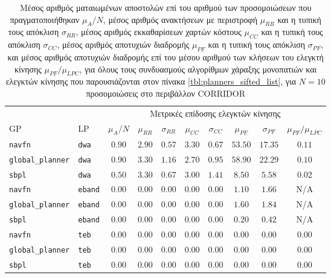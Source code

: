 \begin{table}[h]
\renewcommand{\arraystretch}{1.3}
\begin{tabular}{llcccccccc}
  & & \multicolumn{8}{c}{Μετρικές επίδοσης ελεγκτών κίνησης} \\
  \cline{3-10}
    GP & LP & $\mu_{A} / N$ & $\mu_{RR}$ & $\sigma_{RR}$ & $\mu_{CC}$ & $\sigma_{CC}$ & $\mu_{PF}$ & $\sigma_{PF}$ & $\mu_{PF} / \mu_{LPC}$ \\ \toprule
    \texttt{navfn} & \texttt{dwa} & $0.90$ & $2.90$ & $0.57$ & $3.30$ & $0.67$ & $53.50$ & $17.35$ & $0.11$ \\
    \texttt{global\_planner} & \texttt{dwa} & $0.90$ & $3.30$ & $1.16$ & $2.70$ & $0.95$ & $58.90$ & $22.29$ & $0.10$ \\
    \texttt{sbpl} & \texttt{dwa} & $0.50$ & $3.30$ & $0.67$ & $3.00$ & $1.41$ & $8.50$ & $5.58$ & $0.02$ \\
    \texttt{navfn} & \texttt{eband} & $0.00$ & $0.00$ & $0.00$ & $0.00$ & $0.00$ & $1.10$ & $1.66$ & N/A \\
    \texttt{global\_planner} & \texttt{eband} & $0.00$ & $0.00$ & $0.00$ & $0.00$ & $0.00$ & $1.60$ & $1.84$ & N/A \\
    \texttt{sbpl} & \texttt{eband} & $0.00$ & $0.00$ & $0.00$ & $0.00$ & $0.00$ & $0.20$ & $0.42$ & N/A \\
    \texttt{navfn} & \texttt{teb} & $0.00$ & $0.00$ & $0.00$ & $0.00$ & $0.00$ & $0.00$ & $0.00$ & $0.00$ \\
    \texttt{global\_planner} & \texttt{teb} & $0.00$ & $0.00$ & $0.00$ & $0.00$ & $0.00$ & $0.00$ & $0.00$ & $0.00$ \\
    \texttt{sbpl} & \texttt{teb} & $0.00$ & $0.00$ & $0.00$ & $0.00$ & $0.00$ & $0.00$ & $0.00$ & $0.00$ \\ \bottomrule
\end{tabular}
\caption{\small Μέσος αριθμός ματαιωμένων αποστολών επί του αριθμού των
      προσομοιώσεων που πραγματοποιήθηκαν $\mu_A / N$, μέσος αριθμός ανακτήσεων
      με περιστροφή $\mu_{RR}$ και η τυπική τους απόκλιση $\sigma_{RR}$, μέσος
      αριθμός εκκαθαρίσεων χαρτών κόστους $\mu_{CC}$ και η τυπική τους απόκλιση
      $\sigma_{CC}$, μέσος αριθμός αποτυχιών διαδρομής $\mu_{PF}$ και η τυπική
      τους απόκλιση $\sigma_{PF}$, και μέσος αριθμός αποτυχιών διαδρομής επί
      του μέσου αριθμού των κλήσεων του ελεγκτή κίνησης $\mu_{PF} / \mu_{LPC}$,
      για όλους τους συνδυασμούς αλγορίθμων χάραξης μονοπατιών και ελεγκτών
      κίνησης που παρουσιάζονται στον πίνακα \ref{tbl:planners_sifted_list},
      για $N=10$ προσομοιώσεις στο περιβάλλον CORRIDOR}
\label{tbl:info_failures_corridor}
\end{table}



